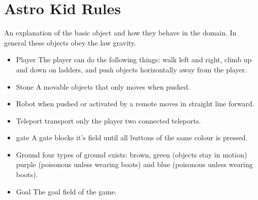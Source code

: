 \section{Astro Kid Rules}
\label{rules}
An explanation of the basic object and how they behave in the domain. In general these objects obey the law gravity.
\begin{itemize}
	\item{Player} The player can do the following things: walk left and right, climb up and down on ladders, and push objects horizontally away from the player.
	\item{Stone} A movable objects that only moves when pushed.
	\item{Robot} when pushed or activated by a remote moves in straight line forward.
	\item{Teleport} transport only the player two connected teleports.
	\item{gate} A gate blocks it's field until all buttons of the same colour is pressed.
	\item{Ground} four types of ground exists: brown, green (objects stay in motion) purple (poisonous unless wearing boots) and blue (poisonous unless wearing boots).
	\item{Goal} The goal field of the game.
\end{itemize}



